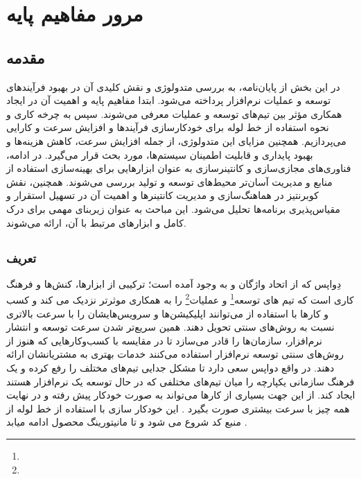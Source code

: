 \chapter{مرور مفاهیم پایه}

\section{مقدمه}

در این بخش از پایان‌نامه، به بررسی متدولوژی  و نقش کلیدی آن در بهبود فرآیندهای توسعه و عملیات نرم‌افزار پرداخته می‌شود. ابتدا مفاهیم پایه  و اهمیت آن در ایجاد همکاری مؤثر بین تیم‌های توسعه و عملیات معرفی می‌شوند. سپس به چرخه کاری  و نحوه استفاده از خط لوله  برای خودکارسازی فرآیندها و افزایش سرعت و کارایی می‌پردازیم. همچنین مزایای این متدولوژی، از جمله افزایش سرعت، کاهش هزینه‌ها و بهبود پایداری و قابلیت اطمینان سیستم‌ها، مورد بحث قرار می‌گیرد. در ادامه، فناوری‌های مجازی‌سازی و کانتینرسازی به عنوان ابزارهایی برای بهینه‌سازی استفاده از منابع و مدیریت آسان‌تر محیط‌های توسعه و تولید بررسی می‌شوند. همچنین، نقش کوبرنتیز در هماهنگ‌سازی و مدیریت کانتینرها و اهمیت آن در تسهیل استقرار و مقیاس‌پذیری برنامه‌ها تحلیل می‌شود. این مباحث به عنوان زیربنای مهمی برای درک کامل  و ابزارهای مرتبط با آن، ارائه می‌شوند.

\section{}

\subsection{تعریف}
دِواپس که از اتحاد واژگان 
 و
به وجود آمده است؛ ترکیبی از ابزارها، کنش‌ها و فرهنگ کاری است که تیم های توسعه\footnote{} و عملیات\footnote{} را به همکاری موثرتر نزدیک می کند و کسب و کارها با استفاده از می‌توانند اپلیکیشن‌ها و سرویس‌هایشان را با سرعت بالاتری نسبت به روش‌های سنتی تحویل دهند. همین سریع‌تر شدن سرعت توسعه و انتشار نرم‌افزار، سازمان‌ها را قادر می‌سازد تا در مقایسه با کسب‌وکارهایی که هنوز از روش‌های سنتی توسعه نرم‌افزار استفاده می‌کنند خدمات بهتری به مشتریانشان ارائه دهند. در واقع دواپس سعی دارد تا مشکل جدایی تیم‌های مختلف را رفع کرده و یک فرهنگ سازمانی یکپارچه را میان تیم‌های مختلفی که در حال توسعه یک نرم‌افزار هستند ایجاد کند. از این جهت بسیاری از کارها می‌تواند به صورت خودکار پیش رفته و در نهایت همه چیز با سرعت بیشتری صورت بگیرد \cite{DevopsDef1,DevopsDef2}. این خودکار سازی با استفاده از خط لوله
از منبع کد شروع می شود و تا مانیتورینگ محصول ادامه میابد \cite{DevopsCICD1}.

